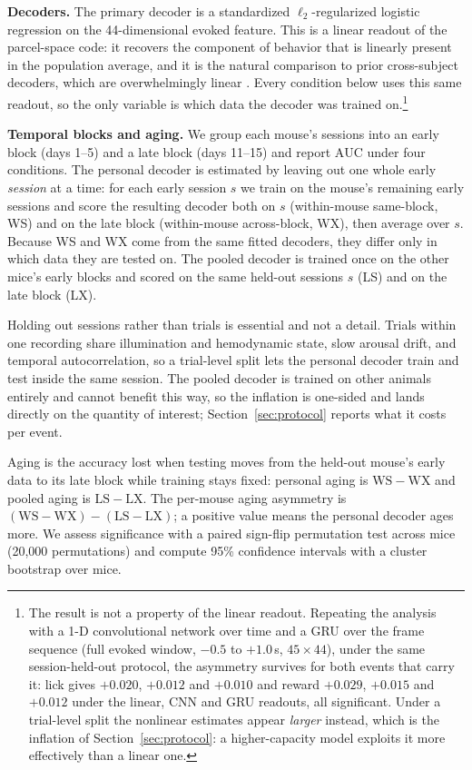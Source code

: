 \documentclass[mlabstract,onecolumn]{jmlr}
\newcommand{\auc}{\mathrm{AUC}}
\begin{document}
\textbf{Decoders.} The primary decoder is a standardized $\ell_2$-regularized logistic regression on
the 44-dimensional evoked feature. This is a linear readout of the parcel-space code: it recovers the
component of behavior that is linearly present in the population average, and it is the natural
comparison to prior cross-subject decoders, which are overwhelmingly linear
\citep{melbaum2022,peterson2021}. Every condition below uses this same readout, so the only variable
is which data the decoder was trained on.\footnote{The result is not a property of the linear
readout. Repeating the analysis with a 1-D convolutional network over time and a GRU over the frame
sequence (full evoked window, $-0.5$ to $+1.0$\,s, $45 \times 44$), under the same session-held-out
protocol, the asymmetry survives for both events that carry it: lick gives $+0.020$, $+0.012$ and
$+0.010$ and reward $+0.029$, $+0.015$ and $+0.012$ under the linear, CNN and GRU readouts, all
significant. Under a trial-level split the nonlinear estimates appear \emph{larger} instead, which is
the inflation of Section~\ref{sec:protocol}: a higher-capacity model exploits it more effectively
than a linear one.}

\textbf{Temporal blocks and aging.} We group each mouse's sessions into an early block (days 1--5)
and a late block (days 11--15) and report $\auc$ under four conditions. The personal decoder is
estimated by leaving out one whole early \emph{session} at a time: for each early session $s$ we
train on the mouse's remaining early sessions and score the resulting decoder both on $s$
(within-mouse same-block, WS) and on the late block (within-mouse across-block, WX), then average
over $s$. Because WS and WX come from the same fitted decoders, they differ only in which data they
are tested on. The pooled decoder is trained once on the other mice's early blocks and scored on the
same held-out sessions $s$ (LS) and on the late block (LX).

Holding out sessions rather than trials is essential and not a detail. Trials within one recording
share illumination and hemodynamic state, slow arousal drift, and temporal autocorrelation, so a
trial-level split lets the personal decoder train and test inside the same session. The pooled
decoder is trained on other animals entirely and cannot benefit this way, so the inflation is
one-sided and lands directly on the quantity of interest; Section~\ref{sec:protocol} reports what it
costs per event.

Aging is the accuracy lost when testing moves from the held-out mouse's early data to its late block
while training stays fixed: personal aging is $\mathrm{WS}-\mathrm{WX}$ and pooled aging is
$\mathrm{LS}-\mathrm{LX}$. The per-mouse aging asymmetry is
$(\mathrm{WS}-\mathrm{WX})-(\mathrm{LS}-\mathrm{LX})$; a positive value means the personal decoder
ages more. We assess significance with a paired sign-flip permutation test across mice
(20{,}000 permutations) and compute 95\% confidence intervals with a cluster bootstrap over mice.
\end{document}
